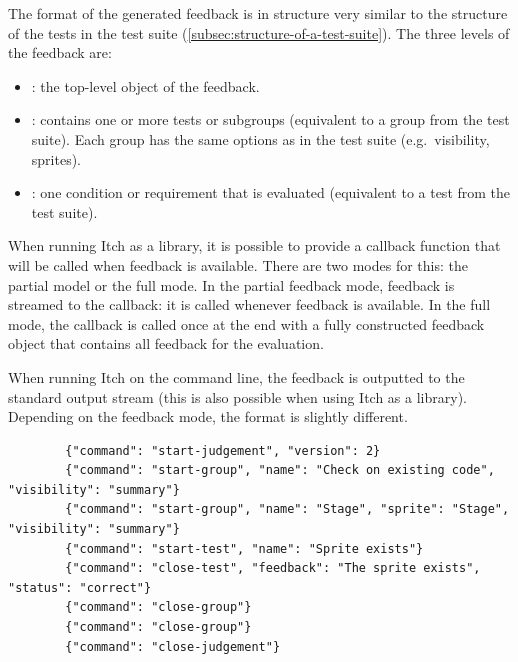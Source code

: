 \documentclass[../main]{subfiles}
\begin{document}
The format of the generated feedback is in structure very similar to the structure of the tests in the test suite (\cref{subsec:structure-of-a-test-suite}).
The three levels of the feedback are:

\begin{itemize}[nosep]
    \item {}: the top-level object of the feedback.
    \item {}: contains one or more tests or subgroups (equivalent to a group from the test suite).
        Each group has the same options as in the test suite (e.g.\ visibility, sprites).
    \item {}: one condition or requirement that is evaluated (equivalent to a test from the test suite).
\end{itemize}

When running Itch as a library, it is possible to provide a callback function that will be called when feedback is available.
There are two modes for this: the partial model or the full mode.
In the partial feedback mode, feedback is streamed to the callback: it is called whenever feedback is available.
In the full mode, the callback is called once at the end with a fully constructed feedback object that contains all feedback for the evaluation.

When running Itch on the command line, the feedback is outputted to the standard output stream (this is also possible when using Itch as a library).
Depending on the feedback mode, the format is slightly different.

\begin{listing}
    \begin{verbatim}
        {"command": "start-judgement", "version": 2}
        {"command": "start-group", "name": "Check on existing code", "visibility": "summary"}
        {"command": "start-group", "name": "Stage", "sprite": "Stage", "visibility": "summary"}
        {"command": "start-test", "name": "Sprite exists"}
        {"command": "close-test", "feedback": "The sprite exists", "status": "correct"}
        {"command": "close-group"}
        {"command": "close-group"}
        {"command": "close-judgement"}
    \end{verbatim}
    \caption{Example of the output generated by Itch for a test suite with two nested groups, with one test. Note the similarity to \cref{lst:tested-output-example}.}\label{lst:itch-output-example-partial}
\end{listing}
\end{document}
